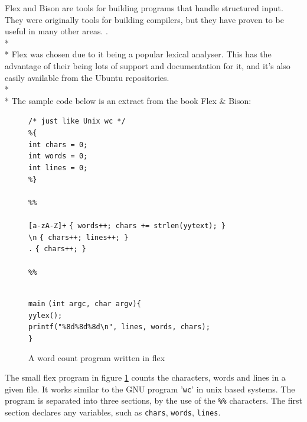 \documentclass[12pt]{report}
\begin{document}
Flex and Bison are tools for building programs that handle structured input.  They were originally tools for building compilers, but they have proven to be useful in many other areas. \citep{flexandbison09}.
\\*
\\*
Flex was chosen due to it being a popular lexical analyser.  This has the advantage of their being lots of support and documentation for it, and it's also easily available from the Ubuntu repositories.\\*
\\*
The sample code below is an extract from the book Flex \& Bison:
\begin{figure}[H]
	\begin{tabbing}
	\texttt{/* just like Unix wc */}\\
	\texttt{\%\{}\\
	\texttt{int chars = 0;}\\
	\texttt{int words = 0;}\\
	\texttt{int lines = 0;}\=\\
	\texttt{\%\}}\\
	\\
	\texttt{\%\%}
	\\
	\\
	\texttt{[a-zA-Z]+} \> \texttt{\{ words++; chars += strlen(yytext); \}}\\
	\texttt{\textbackslash n} \> \texttt{\{ chars++; lines++; \}}\\
	\texttt{.} \> \texttt{\{ chars++; \}}
	\\
	\\
	\texttt{\%\%}
	\\
	\end{tabbing}
	\end{figure}
	\begin{figure}[H]
	\begin{tabbing}
	\ContinuedFloat
	\\
	\texttt{main} \= \texttt{(int argc, char \*\*argv)\{}\\
	\> \texttt{yylex();}\\
	\> \texttt{printf("\%8d\%8d\%8d\textbackslash n", lines, words, chars);}\\
	\texttt{\}}
	\end{tabbing}
	\caption{A word count program written in flex}\label{fig:flexwc}
	\citep{flexandbison09}
\end{figure}
The small flex program in figure \ref{fig:flexwc} counts the characters, words and lines in a given file.  It works similar to the GNU program '\texttt{wc}' in unix based systems.  The program is separated into three sections, by the use of the \texttt{\%\%} characters.  The first section declares any variables, such as \texttt{chars}, \texttt{words}, \texttt{lines}.\\
\end{document}
